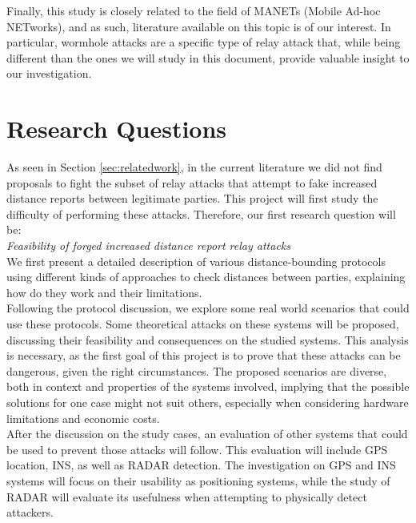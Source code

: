 \documentclass{article}
\begin{document}
Finally, this study is closely related to the field of MANETs (Mobile Ad-hoc NETworks), and as such, literature available on this topic is of our interest. In particular, wormhole attacks \cite{hu2006wormhole, maheshwari2007detecting, goyal2010literature} are a specific type of relay attack that, while being different than the ones we will study in this document, provide valuable insight to our investigation.\\














\section{Research Questions}
\label{sec:researchquestions}

As seen in Section \ref{sec:relatedwork}, in the current literature we did not find proposals to fight the subset of relay attacks that attempt to fake increased distance reports between legitimate parties. This project will first study the difficulty of performing these attacks. Therefore, our first research question will be:\\

\emph{Feasibility of forged increased distance report relay attacks}\\

We first present a detailed description of various distance-bounding protocols using different kinds of approaches to check distances between parties, explaining how do they work and their limitations.\\

Following the protocol discussion, we explore some real world scenarios that could use these protocols. Some theoretical attacks on these systems will be proposed, discussing their feasibility and consequences on the studied systems. This analysis is necessary, as the first goal of this project is to prove that these attacks can be dangerous, given the right circumstances. The proposed scenarios are diverse, both in context and properties of the systems involved, implying that the possible solutions for one case might not suit others, especially when considering hardware limitations and economic costs.\\

After the discussion on the study cases, an evaluation of other systems that could be used to prevent those attacks will follow. This evaluation will include GPS location, INS, as well as RADAR detection. The investigation on GPS and INS systems will focus on their usability as positioning systems, while the study of RADAR will evaluate its usefulness when attempting to physically detect attackers.\\
\end{document}
